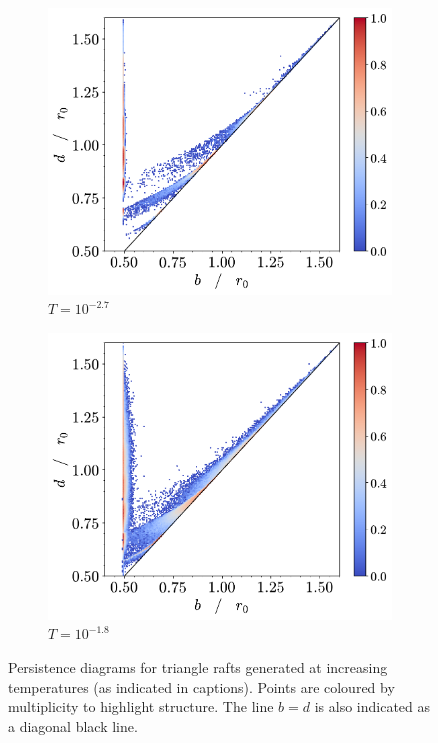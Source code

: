 \begin{figure}[tb]
     \vspace{0.5cm}
     \begin{subfigure}[b]{0.48\textwidth}
         \centering
         \includegraphics[width=\textwidth]{./figures/ph/t-2700_tr_pd.pdf}
         \caption{$T=10^{-2.7}$}
         \label{fig:trpdc}
     \end{subfigure}
     \hfill
      \begin{subfigure}[b]{0.48\textwidth}
         \centering
         \includegraphics[width=\textwidth]{./figures/ph/t-1800_tr_pd.pdf}
         \caption{$T=10^{-1.8}$}
         \label{fig:trpdd}
     \end{subfigure}
     \hfill
    
	\caption{Persistence diagrams for triangle rafts generated at increasing temperatures (as indicated in captions). Points are coloured by multiplicity to highlight structure. The line $b=d$ is also indicated as a diagonal black line.}
	\label{fig:trpd}
\end{figure}

